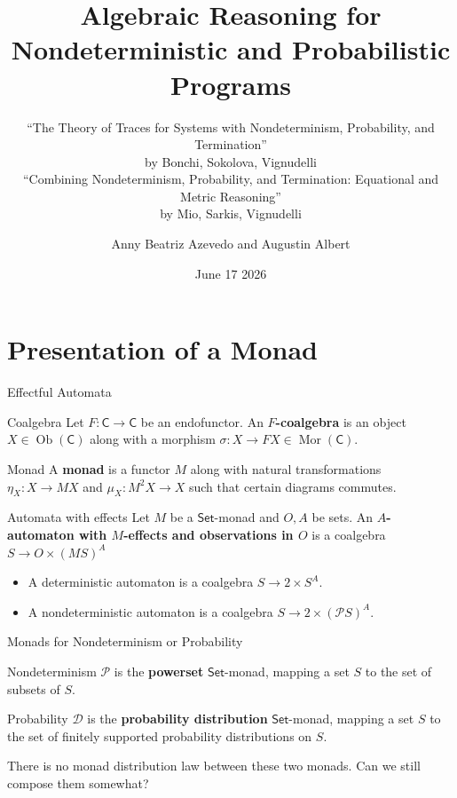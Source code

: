 \documentclass{beamer}
\title{Algebraic Reasoning for Nondeterministic and Probabilistic Programs}
\subtitle{\small ``The Theory of Traces for Systems with
Nondeterminism, Probability, and Termination'' \\ by
Bonchi, Sokolova, Vignudelli\\ ``Combining Nondeterminism, Probability, and Termination: Equational and Metric Reasoning'' \\ by Mio, Sarkis, Vignudelli}
\author{Anny Beatriz Azevedo and Augustin Albert}
\date{June 17 2026}
\begin{document}
\maketitle

\part{Presentation of a Monad}\frame{\partpage}

\begin{frame}{Effectful Automata}

\begin{block}{Coalgebra}
Let $F : \mathsf{C} \to \mathsf{C}$ be an endofunctor. An \textbf{$F$-coalgebra} is an object $X\in \operatorname{Ob}(\mathsf{C}) $ along with a morphism $\sigma: X \to FX \in \operatorname{Mor}(\mathsf{C})$.
\end{block}

\pause

\begin{block}{Monad}
A \textbf{monad} is a functor $M$ along with natural transformations $\eta_X:X \to MX $ and $\mu_X: M^2X \to X$ such that certain diagrams commutes.
\end{block}
\pause

\begin{block}{Automata with effects}
Let $M$ be a $\mathsf{Set}$-monad and $O, A$ be
sets. An \textbf{$A$-automaton with $M$-effects and observations in $O$} is a coalgebra $S \to O \times (MS)^A$
\end{block}

\pause

\begin{example}
    \begin{itemize}
        \item A deterministic automaton is a coalgebra $S \to 2 \times S^A$.
        \item A nondeterministic automaton is a coalgebra $S \to 2 \times (\mathcal P S)^A$.
    \end{itemize}
\end{example}
\end{frame}

\begin{frame}{Monads for Nondeterminism or Probability}
\begin{block}{Nondeterminism}
$\mathcal P$ is the  \textbf{powerset} $\mathsf{Set}$-monad, mapping a set $S$ to the set of subsets of $S$. 
\end{block}\pause

\begin{block}{Probability}
$\mathcal D$ is the \textbf{probability distribution} $\mathsf{Set}$-monad, mapping a set $S$ to the set of finitely supported probability distributions on $S$.
\end{block}
\pause

There is no monad distribution law between these two monads. Can we still compose them somewhat?
\end{frame}
\end{document}
